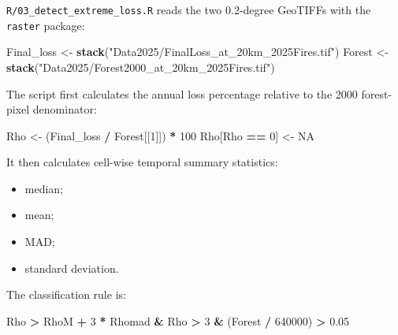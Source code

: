 \documentclass[
]{article}
\newenvironment{Shaded}{\begin{snugshade}}{\end{snugshade}}
\newcommand{\ConstantTok}[1]{\textcolor[rgb]{0.56,0.35,0.01}{#1}}
\newcommand{\DecValTok}[1]{\textcolor[rgb]{0.00,0.00,0.81}{#1}}
\newcommand{\FloatTok}[1]{\textcolor[rgb]{0.00,0.00,0.81}{#1}}
\newcommand{\FunctionTok}[1]{\textcolor[rgb]{0.13,0.29,0.53}{\textbf{#1}}}
\newcommand{\NormalTok}[1]{#1}
\newcommand{\OtherTok}[1]{\textcolor[rgb]{0.56,0.35,0.01}{#1}}
\newcommand{\SpecialCharTok}[1]{\textcolor[rgb]{0.81,0.36,0.00}{\textbf{#1}}}
\newcommand{\StringTok}[1]{\textcolor[rgb]{0.31,0.60,0.02}{#1}}
\providecommand{\tightlist}{%
  \setlength{\itemsep}{0pt}\setlength{\parskip}{0pt}}
\begin{document}
\texttt{R/03\_detect\_extreme\_loss.R} reads the two 0.2-degree GeoTIFFs
with the \texttt{raster} package:

\begin{Shaded}
\begin{Highlighting}[]
\NormalTok{Final\_loss }\OtherTok{\textless{}{-}} \FunctionTok{stack}\NormalTok{(}\StringTok{"Data2025/FinalLoss\_at\_20km\_2025Fires.tif"}\NormalTok{)}
\NormalTok{Forest }\OtherTok{\textless{}{-}} \FunctionTok{stack}\NormalTok{(}\StringTok{"Data2025/Forest2000\_at\_20km\_2025Fires.tif"}\NormalTok{)}
\end{Highlighting}
\end{Shaded}

The script first calculates the annual loss percentage relative to the
2000 forest-pixel denominator:

\begin{Shaded}
\begin{Highlighting}[]
\NormalTok{Rho }\OtherTok{\textless{}{-}}\NormalTok{ (Final\_loss }\SpecialCharTok{/}\NormalTok{ Forest[[}\DecValTok{1}\NormalTok{]]) }\SpecialCharTok{*} \DecValTok{100}
\NormalTok{Rho[Rho }\SpecialCharTok{==} \DecValTok{0}\NormalTok{] }\OtherTok{\textless{}{-}} \ConstantTok{NA}
\end{Highlighting}
\end{Shaded}

It then calculates cell-wise temporal summary statistics:

\begin{itemize}
\tightlist
\item
  median;
\item
  mean;
\item
  MAD;
\item
  standard deviation.
\end{itemize}

The classification rule is:

\begin{Shaded}
\begin{Highlighting}[]
\NormalTok{Rho }\SpecialCharTok{\textgreater{}}\NormalTok{ RhoM }\SpecialCharTok{+} \DecValTok{3} \SpecialCharTok{*}\NormalTok{ Rhomad }\SpecialCharTok{\&}
\NormalTok{Rho }\SpecialCharTok{\textgreater{}} \DecValTok{3} \SpecialCharTok{\&}
\NormalTok{(Forest }\SpecialCharTok{/} \DecValTok{640000}\NormalTok{) }\SpecialCharTok{\textgreater{}} \FloatTok{0.05}
\end{Highlighting}
\end{Shaded}
\end{document}
